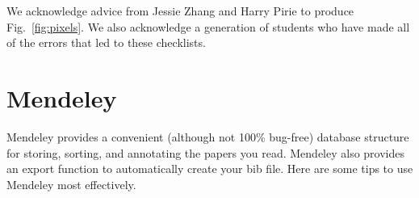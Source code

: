 \documentclass[aps,prb,twocolumn,superscriptaddress,floatfix,longbibliography]{revtex4-2}
\begin{document}
\begin{acknowledgments}
We acknowledge advice from Jessie Zhang and Harry Pirie to produce Fig.\ \ref{fig:pixels}. We also acknowledge a generation of students who have made all of the errors that led to these checklists.
\end{acknowledgments}

\appendix

\section{\label{app:Mendeley}Mendeley}

Mendeley provides a convenient (although not 100\% bug-free) database structure for storing, sorting, and annotating the papers you read. Mendeley also provides an export function to automatically create your bib file. Here are some tips to use Mendeley most effectively.
\end{document}
